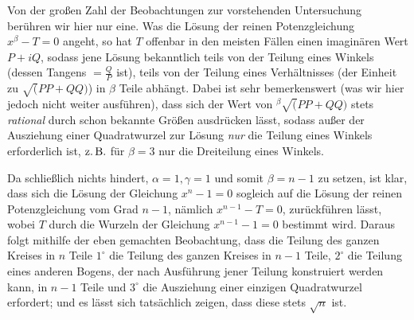 Von der großen Zahl der Beobachtungen zur vorstehenden Untersuchung berühren wir hier nur eine. Was die Lösung der reinen Potenzgleichung \(x^\beta-T=0\) angeht, so hat \(T\) offenbar in den meisten Fällen einen imaginären Wert \(P+iQ\), sodass jene Lösung bekanntlich teils von der Teilung eines Winkels (dessen Tangens \(=\frac QP\) ist), teils von der Teilung eines Verhältnisses (der Einheit zu \(\surd(PP+QQ)\)) in \(\beta\) Teile abhängt. Dabei ist sehr bemerkenswert (was wir hier jedoch nicht weiter ausführen), dass sich der Wert von \({}^{\beta}\!\surd(PP+QQ)\) stets \textit{rational} durch schon bekannte Größen ausdrücken lässt, sodass außer der Ausziehung einer Quadratwurzel zur Lösung \textit{nur} die Teilung eines Winkels erforderlich ist, \(\text{z.\,B.}\) für \(\beta=3\) nur die Dreiteilung eines Winkels.

Da schließlich nichts hindert, \(\alpha=1,\allowbreak \gamma=1\) und somit
\(\beta=n-1\) zu setzen, ist klar, dass sich die Lösung der Gleichung \(x^n-1=0\) sogleich auf die Lösung der reinen Potenzgleichung vom Grad \(n-1\), nämlich \(x^{n-1}-T=0\), zurückführen lässt, wobei \(T\) durch die Wurzeln der Gleichung \(x^{n-1}-1=0\) bestimmt wird. Daraus folgt mithilfe der eben gemachten Beobachtung, dass die Teilung des ganzen Kreises in \(n\) Teile \(1^\circ\) die Teilung des ganzen Kreises in \(n-1\) Teile, \(2^\circ\) die Teilung eines anderen Bogens, der nach Ausführung jener Teilung konstruiert werden kann, in \(n-1\) Teile und \(3^\circ\) die Ausziehung einer einzigen Quadratwurzel erfordert; und es lässt sich tatsächlich zeigen, dass diese stets \(\surd n\) ist.
